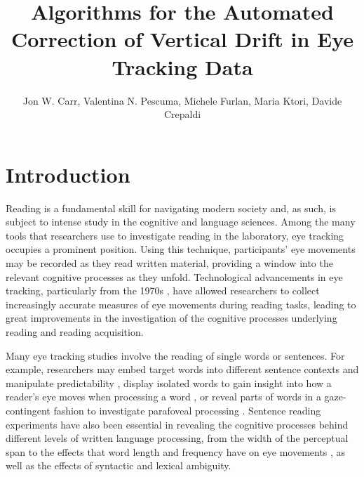 \documentclass[doc,biblatex]{apa7}
\title{Algorithms for the Automated Correction of Vertical Drift in Eye Tracking Data}
\author{Jon W. Carr, Valentina N. Pescuma, Michele Furlan, Maria Ktori, Davide Crepaldi}
\affiliation{Cognitive Neuroscience, International School for Advanced Studies, Trieste, Italy}
\begin{document}
\maketitle

\section{Introduction}

Reading is a fundamental skill for navigating modern society and, as such, is subject to intense study in the cognitive and language sciences. Among the many tools that researchers use to investigate reading in the laboratory, eye tracking occupies a prominent position. Using this technique, participants' eye movements may be recorded as they read written material, providing a window into the relevant cognitive processes as they unfold. Technological advancements in eye tracking, particularly from the 1970s \parencite[see e.g.,][]{Rayner:1998}, have allowed researchers to collect increasingly accurate measures of eye movements during reading tasks, leading to great improvements in the investigation of the cognitive processes underlying reading and reading acquisition.

Many eye tracking studies involve the reading of single words or sentences. For example, researchers may embed target words into different sentence contexts and manipulate predictability \parencite[e.g.,][]{Rayner:2001}, display isolated words to gain insight into how a reader's eye moves when processing a word \parencite[e.g.,][]{Vitu:2004}, or reveal parts of words in a gaze-contingent fashion to investigate parafoveal processing \parencite[e.g.,][]{Schotter:2012}. Sentence reading experiments have also been essential in revealing the cognitive processes behind different levels of written language processing, from the width of the perceptual span \parencite[e.g.,][]{Rayner:1986,Blythe:2009} to the effects that word length and frequency have on eye movements \parencite[e.g.,][]{Joseph:2009,TiffinRichards:2015}, as well as the effects of syntactic \parencite[e.g.,][]{Frazier:1982,Pickering:1998} and lexical \parencite[e.g.,][]{Sereno:2006} ambiguity.
\end{document}

